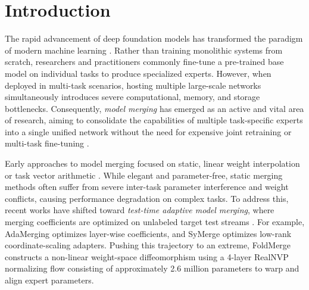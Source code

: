 \section{Introduction}
\label{sec:intro}

The rapid advancement of deep foundation models has transformed the paradigm of modern machine learning \cite{radford2021learning, brown2020language, devlin2018bert}. Rather than training monolithic systems from scratch, researchers and practitioners commonly fine-tune a pre-trained base model on individual tasks to produce specialized experts. However, when deployed in multi-task scenarios, hosting multiple large-scale networks simultaneously introduces severe computational, memory, and storage bottlenecks. Consequently, {\it model merging} has emerged as an active and vital area of research, aiming to consolidate the capabilities of multiple task-specific experts into a single unified network without the need for expensive joint retraining or multi-task fine-tuning \cite{ilharco2022editing, yadav2023ties, wortsman2022model}.

Early approaches to model merging focused on static, linear weight interpolation or task vector arithmetic \cite{ilharco2022editing, wortsman2022model}. While elegant and parameter-free, static merging methods often suffer from severe inter-task parameter interference and weight conflicts, causing performance degradation on complex tasks. To address this, recent works have shifted toward {\it test-time adaptive model merging}, where merging coefficients are optimized on unlabeled target test streams \cite{yang2024adamerging, jung2025symerge}. For example, AdaMerging \cite{yang2024adamerging} optimizes layer-wise coefficients, and SyMerge \cite{jung2025symerge} optimizes low-rank coordinate-scaling adapters. Pushing this trajectory to an extreme, FoldMerge \cite{foldmerge} constructs a non-linear weight-space diffeomorphism using a 4-layer RealNVP normalizing flow consisting of approximately 2.6 million parameters to warp and align expert parameters.

